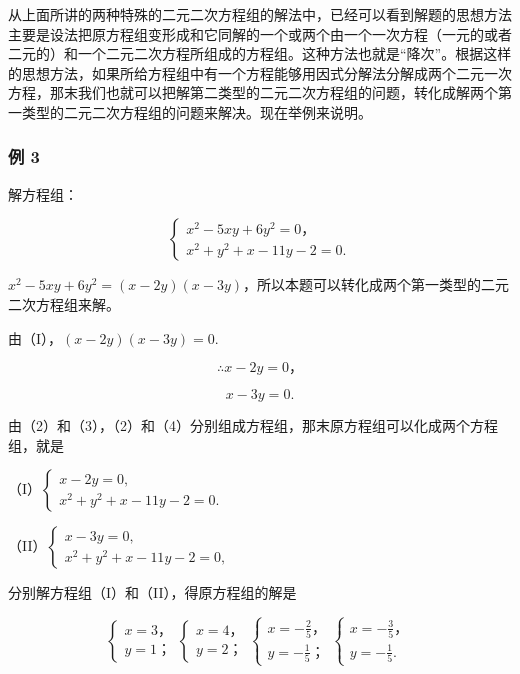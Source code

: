 从上面所讲的两种特殊的二元二次方程组的解法中，已经可以看到解题的思想方法主要是设法把原方程组变形成和它同解的一个或两个由一个一次方程（一元的或者二元的）和一个二元二次方程所组成的方程组。这种方法也就是``降次''。根据这样的思想方法，如果所给方程组中有一个方程能够用因式分解法分解成两个二元一次方程，那末我们也就可以把解第二类型的二元二次方程组的问题，转化成解两个第一类型的二元二次方程组的问题来解决。现在举例来说明。

\subsubsection{例 3}

解方程组：

\[
\left\{ \begin{array}{l} x ^ {2} - 5 x y + 6 y ^ {2} = 0\text{，} \\ x ^ {2} + y ^ {2} + x - 11 y - 2 = 0. \end{array} \right. \tag{1}
\]

\(x^{2} - 5xy + 6y^{2} = (x - 2y)(x - 3y)\)，所以本题可以转化成两个第一类型的二元二次方程组来解。

 由（I），\((x-2y)(x-3y)=0.\)

\[
\therefore x - 2 y = 0\text{，} \tag{3}
\]

\[
x - 3 y = 0. \tag{4}
\]

由（2）和（3），（2）和（4）分别组成方程组，那末原方程组可以化成两个方程组，就是

（I）\(\left\{ \begin{array}{l} x - 2y = 0, \\ x^2 + y^2 + x - 11y - 2 = 0. \end{array} \right.\)

（II）\(\left\{ \begin{array}{l} x - 3y = 0, \\ x^2 + y^2 + x - 11y - 2 = 0, \end{array} \right.\)

分别解方程组（I）和（II），得原方程组的解是

\[
\left\{ \begin{array}{l} x = 3\text{，} \\ y = 1\text{；} \end{array} \right. \left\{ \begin{array}{l} x = 4\text{，} \\ y = 2\text{；} \end{array} \right. \left\{ \begin{array}{l} x = - \frac{2}{5}\text{，} \\ y = - \frac{1}{5}\text{；} \end{array} \right. \left\{ \begin{array}{l} x = - \frac{3}{5}\text{，} \\ y = - \frac{1}{5}. \end{array} \right.
\]

